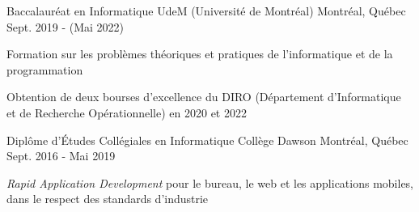 

\begin{cventries}

  \cventry
    {Baccalauréat en Informatique} %
    {UdeM (Université de Montréal)} %
    {Montréal, Québec} %
    {Sept. 2019 - (Mai 2022)} %
    {
      \begin{cvitems} %
        \item {Formation sur les problèmes théoriques et pratiques de l'informatique et de la programmation}
        \item {Obtention de deux bourses d'excellence du DIRO (Département d'Informatique et de Recherche Opérationnelle) en 2020 et 2022}
      \end{cvitems}
    }
  \cventry
    {Diplôme d'Études Collégiales en Informatique} %
    {Collège Dawson} %
    {Montréal, Québec} %
    {Sept. 2016 - Mai 2019} %
    {
      \begin{cvitems} %
        \item {\textit{Rapid Application Development} pour le bureau, le web et les applications mobiles, dans le respect des standards d'industrie}
      \end{cvitems}
    }

\end{cventries}
